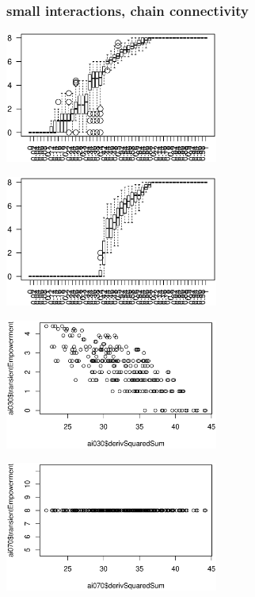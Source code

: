 \documentclass[conference]{IEEEtran}
\begin{document}
\pagebreak


\subsubsection{small interactions, chain connectivity}

\rule{0pt}{0pt}

\centerline{\includegraphics[width=7cm]{n08_chain_small_emp.eps}}

\centerline{\includegraphics[width=7cm]{n08_chain_small_empsust.eps}}

\centerline{\includegraphics[width=7cm]{n08_chain_small_corr_dss_emp_ai030.eps}}

\centerline{\includegraphics[width=7cm]{n08_chain_small_corr_dss_emp_ai070.eps}}
\end{document}
